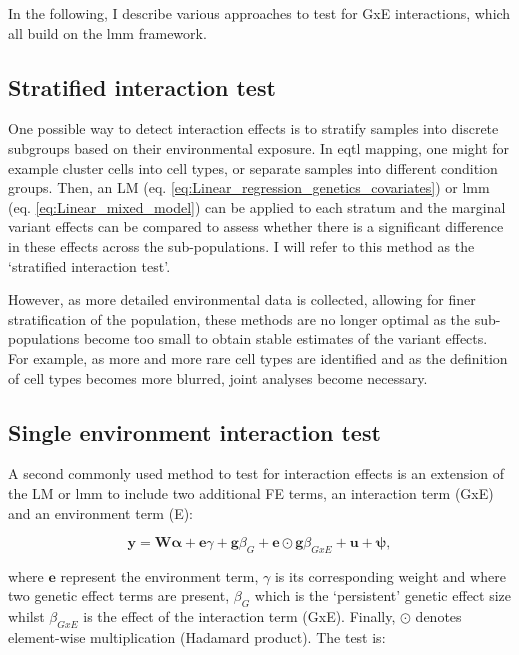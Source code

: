 In the following, I describe various approaches to test for GxE interactions, which all build on the \gls{lmm} framework. 

\newpage

\subsection{Stratified interaction test}

One possible way to detect interaction effects is to stratify samples into discrete subgroups based on their environmental exposure.
In \gls{eqtl} mapping, one might for example cluster cells into cell types, or separate samples into different condition groups.
Then, an LM (eq. \eqref{eq:Linear_regression_genetics_covariates}) or \gls{lmm} (eq. \eqref{eq:Linear_mixed_model}) can be applied to each stratum and the marginal variant effects can be compared to assess whether there is a significant difference in these effects across the sub-populations.
I will refer to this method as the `stratified interaction test'.

However, as more detailed environmental data is collected, allowing for finer stratification of the population, these methods are no longer optimal as the sub-populations become too small to obtain stable estimates of the variant effects.
For example, as more and more rare cell types are identified and as the definition of cell types becomes more blurred, joint analyses become necessary.


\subsection{Single environment interaction test}

A second commonly used method to test for interaction effects is an extension of the LM or \gls{lmm} to include two additional FE terms, an interaction term (GxE) and an environment term (E):

\begin{equation}\label{eq:Interaction_test_FE_LMM}
 \mathbf{y} =  \mathbf{W}\boldsymbol{\alpha} + \mathbf{e}\gamma  + \mathbf{g}\beta_G + \mathbf{e}\odot\mathbf{g}\beta_{GxE} + \mathbf{u} + \boldsymbol{\psi}, 
\end{equation}

where $\mathbf{e}$ represent the environment term, $\gamma$ is its corresponding weight and where two genetic effect terms are present, $\beta_G$ which is the `persistent' genetic effect size whilst $\beta_{GxE}$ is the effect of the interaction term (GxE).
Finally, $\odot$ denotes element-wise multiplication (Hadamard product).
The test is:

